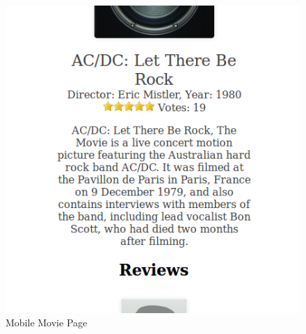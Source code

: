 \documentclass[10pt,a4paper]{scrreprt}
\begin{document}
\begin{figure}[H]
\centering
\includegraphics[scale=.5]{mobilemovie.png}
\caption{Mobile Movie Page}
\end{figure}
\end{document}
